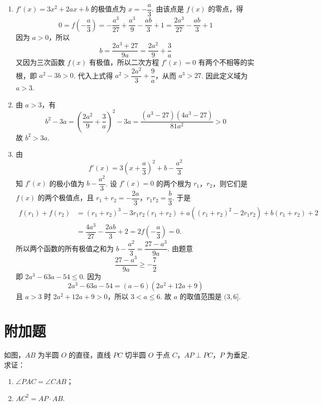 \begin{solution}
\begin{enumerate}
\item \(f'(x)=3x^2+2ax+b\) 的极值点为 \(x=-\dfrac a3\). 由该点是 \(f(x)\) 的零点，得
\[
0=f\left(-\dfrac a3\right)=-\dfrac{a^3}{27}+\dfrac{a^3}{9}-\dfrac{ab}{3}+1=\dfrac{2a^3}{27}-\dfrac{ab}{3}+1
\]
因为 \(a>0\)，所以
\[
b=\dfrac{2a^3+27}{9a}=\dfrac{2a^2}{9}+\dfrac3a
\]
又因为三次函数 \(f(x)\) 有极值，所以二次方程 \(f'(x)=0\) 有两个不相等的实根，即 \(a^2-3b>0\). 代入上式得 \(a^2>\dfrac{2a^2}{3}+\dfrac9a\)，从而 \(a^3>27\). 因此定义域为 \(a>3\).
\item 由 \(a>3\)，有
\[
b^2-3a=\left(\dfrac{2a^2}{9}+\dfrac3a\right)^2-3a=\dfrac{(a^3-27)(4a^3-27)}{81a^2}>0
\]
故 \(b^2>3a\).
\item 由
\[
f'(x)=3\left(x+\dfrac a3\right)^2+b-\dfrac{a^2}{3}
\]
知 \(f'(x)\) 的极小值为 \(b-\dfrac{a^2}{3}\). 设 \(f'(x)=0\) 的两个根为 \(r_1\)，\(r_2\)，则它们是 \(f(x)\) 的两个极值点，且
\(r_1+r_2=-\dfrac{2a}{3}\)，\(r_1r_2=\dfrac b3\).
于是
\[
\begin{aligned}
f(r_1)+f(r_2)&=(r_1+r_2)^3-3r_1r_2(r_1+r_2)+a\left((r_1+r_2)^2-2r_1r_2\right)+b(r_1+r_2)+2\\
&=\dfrac{4a^3}{27}-\dfrac{2ab}{3}+2=2f\left(-\dfrac a3\right)=0.
\end{aligned}
\]
所以两个函数的所有极值之和为 \(b-\dfrac{a^2}{3}=\dfrac{27-a^3}{9a}\). 由题意
\[
\dfrac{27-a^3}{9a}\ge-\dfrac72
\]
即 \(2a^3-63a-54\le0\). 因为
\[
2a^3-63a-54=(a-6)(2a^2+12a+9)
\]
且 \(a>3\) 时 \(2a^2+12a+9>0\)，所以 \(3<a\le6\). 故 \(a\) 的取值范围是 \((3,6]\).
\end{enumerate}
\end{solution}

\section{附加题}

\begin{problem}[A]
如图，\(AB\) 为半圆 \(O\) 的直径，直线 \(PC\) 切半圆 \(O\) 于点 \(C\)，\(AP\perp PC\)，\(P\) 为垂足. 求证：

\begin{enumerate}
\item \(\angle PAC=\angle CAB\)；
\item \(AC^2=AP\cdot AB\).
\end{enumerate}

\end{problem}

